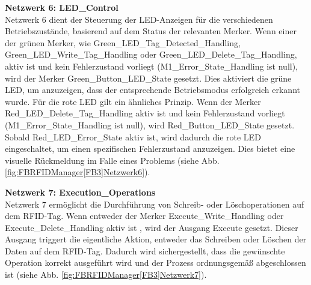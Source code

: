 \textbf{Netzwerk 6: LED\_Control}\\
Netzwerk 6 dient der Steuerung der LED-Anzeigen für die verschiedenen Betriebszustände, basierend auf dem Status der relevanten Merker. Wenn einer der grünen Merker, wie Green\_LED\_Tag\_Detected\_Handling, Green\_LED\_Write\_Tag\_Handling oder Green\_LED\_Delete\_Tag\_Handling, aktiv ist  und kein Fehlerzustand vorliegt (M1\_Error\_State\_Handling ist null), wird der Merker Green\_Button\_LED\_State gesetzt. Dies aktiviert die grüne LED, um anzuzeigen, dass der entsprechende Betriebsmodus erfolgreich erkannt wurde.
Für die rote LED gilt ein ähnliches Prinzip. Wenn der Merker Red\_LED\_Delete\_Tag\_Handling aktiv ist und kein Fehlerzustand vorliegt (M1\_Error\_State\_Handling ist null), wird Red\_Button\_LED\_State gesetzt. Sobald Red\_LED\_Error\_State aktiv ist, wird dadurch die rote LED eingeschaltet, um einen spezifischen Fehlerzustand anzuzeigen. Dies bietet eine visuelle Rückmeldung im Falle eines Problems (siehe Abb. \ref{fig:FBRFIDManager[FB3]Netzwerk6}).

\textbf{Netzwerk 7: Execution\_Operations}\\
Netzwerk 7 ermöglicht die Durchführung von Schreib- oder Löschoperationen auf dem RFID-Tag. Wenn entweder der Merker Execute\_Write\_Handling oder Execute\_Delete\_Handling aktiv ist , wird der Ausgang Execute gesetzt. Dieser Ausgang triggert die eigentliche Aktion, entweder das Schreiben oder Löschen der Daten auf dem RFID-Tag. Dadurch wird sichergestellt, dass die gewünschte Operation korrekt ausgeführt wird und der Prozess ordnungsgemäß abgeschlossen ist (siehe Abb. \ref{fig:FBRFIDManager[FB3]Netzwerk7}).
